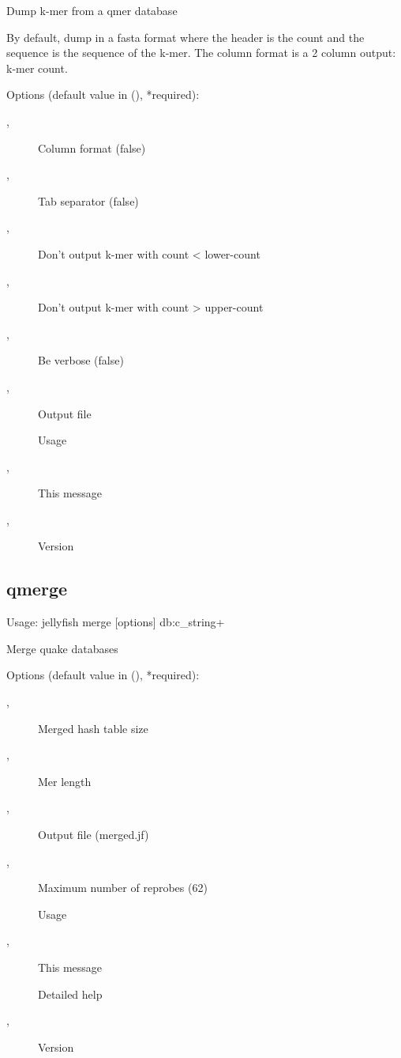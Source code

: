\noindent Dump k-mer from a qmer database

\noindent By default, dump in a fasta format where the header is the count and
\noindent the sequence is the sequence of the k-mer. The column format is a 2
\noindent column output: k-mer count.

\noindent Options (default value in (), *required):
\begin{description}
\item[,] \noindent Column format (false)
\item[,] \noindent Tab separator (false)
\item[,] \noindent Don't output k-mer with count < lower-count
\item[,] \noindent Don't output k-mer with count > upper-count
\item[,] \noindent Be verbose (false)
\item[,] \noindent Output file
\item[] \noindent Usage
\item[,] \noindent This message
\item[,] \noindent Version
\end{description}
\subsection{qmerge}
\noindent Usage: jellyfish merge [options] db:c\_string+

\noindent Merge quake databases

\noindent Options (default value in (), *required):
\begin{description}
\item[,] \noindent *Merged hash table size
\item[,] \noindent *Mer length
\item[,] \noindent Output file (merged.jf)
\item[,] \noindent Maximum number of reprobes (62)
\item[] \noindent Usage
\item[,] \noindent This message
\item[] \noindent Detailed help
\item[,] \noindent Version
\end{description}
